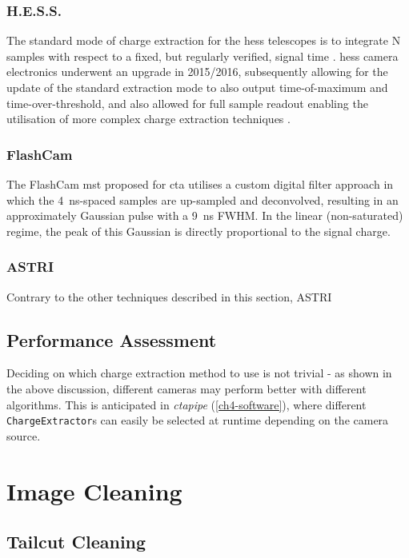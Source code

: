 \subsubsection{H.E.S.S.}

The standard mode of charge extraction for the \gls{hess} telescopes is to integrate N samples with respect to a fixed, but regularly verified, signal time \cite{Aharonian2004}. \gls{hess} camera electronics underwent an upgrade in 2015/2016, subsequently allowing for the update of the standard extraction mode to also output time-of-maximum and time-over-threshold, and also allowed for full sample readout enabling the utilisation of more complex charge extraction techniques \cite{Klepser2017}\cite{Chalme-Calvet2015}.

\subsubsection{FlashCam}

The FlashCam \gls{mst} proposed for \gls{cta} utilises a custom digital filter approach in which the 4~ns-spaced samples are up-sampled and deconvolved, resulting in an approximately Gaussian pulse with a 9~ns FWHM. In the linear (non-saturated) regime, the peak of this Gaussian is directly proportional to the signal charge. 

\subsubsection{ASTRI}

Contrary to the other techniques described in this section, ASTRI 

\subsection{Performance Assessment}

Deciding on which charge extraction method to use is not trivial - as shown in the above discussion, different cameras may perform better with different algorithms. This is anticipated in \textit{ctapipe} (\ref{ch4-software}), where different \lstinline{ChargeExtractor}s can easily be selected at runtime depending on the camera source. 

\section{Image Cleaning}

\subsection{Tailcut Cleaning}

